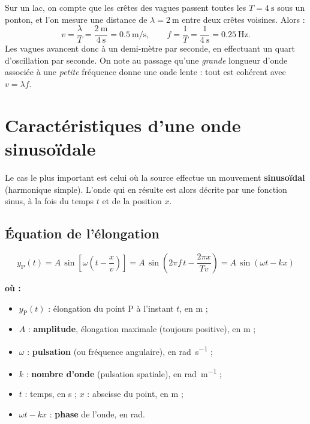 \documentclass[11pt,a4paper]{article}
\newenvironment{ou}{%
  \par\smallskip\noindent\textbf{où :}\nopagebreak
  \begin{itemize}[leftmargin=1.8em,topsep=2pt,itemsep=1.5pt,parsep=0pt]}%
  {\end{itemize}}
\begin{document}
\begin{exemple}
Sur un lac, on compte que les crêtes des vagues passent toutes les $T = \SI{4}{\second}$
sous un ponton, et l'on mesure une distance de $\lambda = \SI{2}{\metre}$ entre deux crêtes
voisines. Alors :
\[ v = \frac{\lambda}{T} = \frac{\SI{2}{\metre}}{\SI{4}{\second}} = \SI{0.5}{\metre\per\second},
   \qquad f = \frac{1}{T} = \frac{1}{\SI{4}{\second}} = \SI{0.25}{\hertz}. \]
Les vagues avancent donc à un demi-mètre par seconde, en effectuant un quart d'oscillation
par seconde. On note au passage qu'une \emph{grande} longueur d'onde associée à une
\emph{petite} fréquence donne une onde lente : tout est cohérent avec $v = \lambda f$.
\end{exemple}

\section{Caractéristiques d'une onde sinusoïdale}
\label{sec:sinus}

Le cas le plus important est celui où la source effectue un mouvement \textbf{sinusoïdal}
(harmonique simple). L'onde qui en résulte est alors décrite par une fonction sinus, à la fois
du temps $t$ et de la position $x$.

\subsection{Équation de l'élongation}

\begin{formule}
\[ \boxed{\,y_{\mathrm P}(t) = A\,\sin\!\left[\omega\!\left(t-\frac{x}{v}\right)\right]
   = A\,\sin\!\left(2\pi f\,t - \frac{2\pi x}{Tv}\right)
   = A\,\sin\!\left(\omega t - k x\right)\,} \]
\begin{ou}
  \item $y_{\mathrm P}(t)$ : élongation du point P à l'instant $t$, en \si{\metre} ;
  \item $A$ : \textbf{amplitude}, élongation maximale (toujours positive), en \si{\metre} ;
  \item $\omega$ : \textbf{pulsation} (ou fréquence angulaire), en \si{\radian\per\second} ;
  \item $k$ : \textbf{nombre d'onde} (pulsation spatiale), en \si{\radian\per\metre} ;
  \item $t$ : temps, en \si{\second} ; \quad $x$ : abscisse du point, en \si{\metre} ;
  \item $\omega t - kx$ : \textbf{phase} de l'onde, en \si{\radian}.
\end{ou}
\end{formule}
\end{document}
